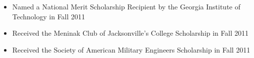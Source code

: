 \documentclass[]{rrollins-res}
\begin{document}


\begin{itemize}

\itemsep0em

\item Named a National Merit Scholarship Recipient by the Georgia Institute of Technology in Fall 2011
\item Received the Meninak Club of Jacksonville's College Scholarship in Fall 2011
\item Received the Society of American Military Engineers Scholarship in Fall 2011


\end{itemize}
\end{document}
